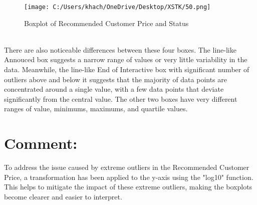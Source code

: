 \documentclass[a4paper]{article}
\begin{document}
	\begin{figure}[htbp]
		\centering
		\begin{adjustbox}{width=0.5\textwidth, frame}
			\texttt{[image: C:/Users/khach/OneDrive/Desktop/XSTK/50.png]}
		\end{adjustbox}
		\captionsetup{justification=centering}
		\vspace{0.5cm}
		\caption{Boxplot of Recommended Customer Price and Status}
	\end{figure}
	\\
	There are also noticeable differences between these four boxes. The line-like Annouced box suggests a narrow range of values or very little variability in the data. Meanwhile, the line-like End of Interactive box with significant number of outliers above and below it suggests that the majority of data points are concentrated around a single value, with a few data points that deviate significantly from the central value. The other two boxes have very different ranges of value, minimums, maximums, and quartile values.
	\section*{Comment:}
	To address the issue caused by extreme outliers in the Recommended Customer Price, a transformation has been applied to the y-axis using the "log10" function. This helps to mitigate the impact of these extreme outliers, making the boxplots become clearer and easier to interpret.
\end{document}
